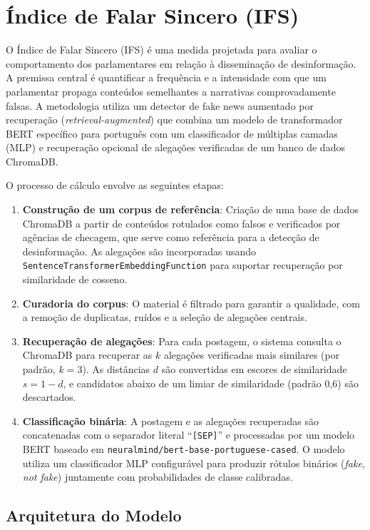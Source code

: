 \section{Índice de Falar Sincero (IFS)}

O Índice de Falar Sincero (IFS) é uma medida projetada para avaliar o comportamento dos parlamentares em relação à disseminação de desinformação. A premissa central é quantificar a frequência e a intensidade com que um parlamentar propaga conteúdos semelhantes a narrativas comprovadamente falsas. A metodologia utiliza um detector de fake news aumentado por recuperação (\textit{retrieval-augmented}) que combina um modelo de transformador BERT específico para português com um classificador de múltiplas camadas (MLP) e recuperação opcional de alegações verificadas de um banco de dados ChromaDB.

O processo de cálculo envolve as seguintes etapas:
\begin{enumerate}
    \item \textbf{Construção de um corpus de referência}: Criação de uma base de dados ChromaDB a partir de conteúdos rotulados como falsos e verificados por agências de checagem, que serve como referência para a detecção de desinformação. As alegações são incorporadas usando \texttt{SentenceTransformerEmbeddingFunction} para suportar recuperação por similaridade de cosseno.
    \item \textbf{Curadoria do corpus}: O material é filtrado para garantir a qualidade, com a remoção de duplicatas, ruídos e a seleção de alegações centrais.
    \item \textbf{Recuperação de alegações}: Para cada postagem, o sistema consulta o ChromaDB para recuperar as $k$ alegações verificadas mais similares (por padrão, $k=3$). As distâncias $d$ são convertidas em escores de similaridade $s = 1 - d$, e candidatos abaixo de um limiar de similaridade (padrão 0,6) são descartados.
    \item \textbf{Classificação binária}: A postagem e as alegações recuperadas são concatenadas com o separador literal ``\texttt{[SEP]}'' e processadas por um modelo BERT baseado em \texttt{neuralmind/bert-base-portuguese-cased}. O modelo utiliza um classificador MLP configurável para produzir rótulos binários (\textit{fake}, \textit{not fake}) juntamente com probabilidades de classe calibradas.
\end{enumerate}

\subsection{Arquitetura do Modelo}

